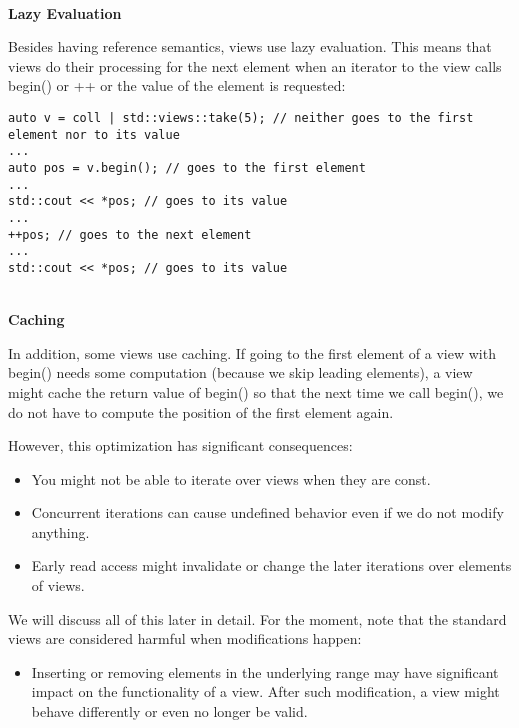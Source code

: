 \noindent
\hspace*{\fill} \\ %
\textbf{Lazy Evaluation}

Besides having reference semantics, views use lazy evaluation. This means that views do their processing for the next element when an iterator to the view calls begin() or ++ or the value of the element is requested:

\begin{lstlisting}[style=styleCXX]
auto v = coll | std::views::take(5); // neither goes to the first element nor to its value
...
auto pos = v.begin(); // goes to the first element
...
std::cout << *pos; // goes to its value
...
++pos; // goes to the next element
...
std::cout << *pos; // goes to its value
\end{lstlisting}

\noindent
\hspace*{\fill} \\ %
\textbf{Caching}

In addition, some views use caching. If going to the first element of a view with begin() needs some computation (because we skip leading elements), a view might cache the return value of begin() so that the next time we call begin(), we do not have to compute the position of the first element again.

However, this optimization has significant consequences:

\begin{itemize}
\item
You might not be able to iterate over views when they are const.

\item
Concurrent iterations can cause undefined behavior even if we do not modify anything.

\item
Early read access might invalidate or change the later iterations over elements of views.
\end{itemize}

We will discuss all of this later in detail. For the moment, note that the standard views are considered harmful when modifications happen:

\begin{itemize}
\item
Inserting or removing elements in the underlying range may have significant impact on the functionality of a view. After such modification, a view might behave differently or even no longer be valid.
\end{itemize}


